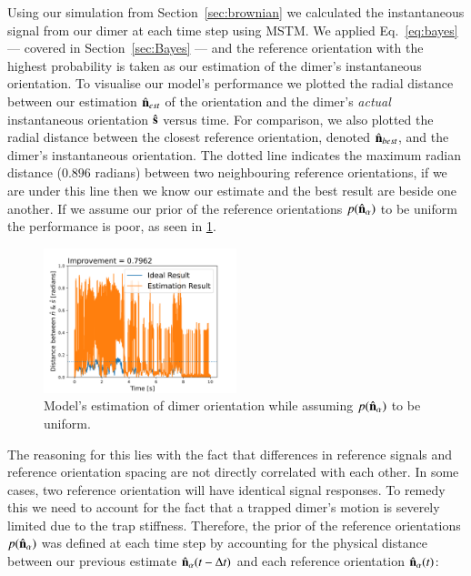 \documentclass[final, 3p]{elsarticle}
\begin{document}
Using our simulation from Section~\ref{sec:brownian} we calculated the instantaneous signal from our dimer at each time step using MSTM.  We applied Eq.~\eqref{eq:bayes} --- covered in Section~\ref{sec:Bayes} --- and the reference orientation with the highest probability is taken as our estimation of the dimer's instantaneous orientation. To visualise our model's performance  we plotted the radial distance between our estimation $\hat{\bf n}_{est}$ of the orientation and the dimer's \emph{actual} instantaneous orientation $\hat{\bf s}$ versus time. For comparison, we also plotted the radial distance between the closest reference orientation, denoted $\hat{\bf n}_{best}$, and the dimer's instantaneous orientation. The dotted line indicates the maximum radian distance ($0.896$ radians) between two neighbouring reference orientations, if we are under this line then we know our estimate and the best result are beside one another. If we assume our prior of the reference orientations $p(\hat{\bf n}_\alpha)$ to be uniform the performance is poor, as seen in \ref{fig:uniform}.

\begin{figure}[h]
	\centering
	\includegraphics[width=0.5\textwidth]{./Images/uniform_pn.png}
	\caption{Model's estimation of dimer orientation while assuming $p(\hat{\bf n}_\alpha)$ to be uniform.}
	\label{fig:uniform}
\end{figure} 

The reasoning for this lies with the fact that differences in reference signals and reference orientation spacing are not directly correlated with each other. In some cases, two reference orientation will have identical signal responses. To remedy this we need to account for the fact that a trapped dimer's motion is severely limited due to the trap stiffness. Therefore, the prior of the reference orientations $p(\hat{\bf n}_\alpha)$ was defined at each time step by accounting for the physical distance between our previous estimate $\hat{\bf n}_{\alpha}(t - \Delta t)$ and each reference orientation $\hat{\bf n}_\alpha(t)$:
\end{document}
